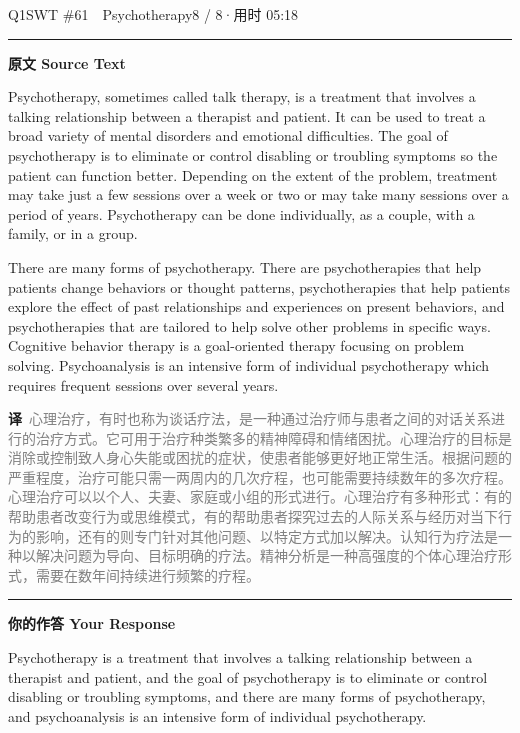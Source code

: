 \documentclass[11pt]{article}
\newcommand{\ptesub}[1]{%
  \par\needspace{2\baselineskip}\smallskip
  {\color{cAccent}\rule[-0.2ex]{3pt}{1.05em}}\hspace{6pt}%
  {\bfseries\color{cHead}#1}\par\nopagebreak\smallskip}
\newcommand{\zh}[1]{{\footnotesize\textcolor{cNote}{\textbf{译}}\ \textcolor{gray}{#1}}}
\begin{document}

\begin{qblock}{Q1\quad SWT \#61\ \ Psychotherapy}{8 / 8\quad·\quad 用时 05:18}

\ptesub{原文 Source Text}
\begin{promptbox}
Psychotherapy, sometimes called talk therapy, is a treatment that involves a talking relationship between a therapist and patient. It can be used to treat a broad variety of mental disorders and emotional difficulties. The goal of psychotherapy is to eliminate or control disabling or troubling symptoms so the patient can function better. Depending on the extent of the problem, treatment may take just a few sessions over a week or two or may take many sessions over a period of years. Psychotherapy can be done individually, as a couple, with a family, or in a group.

There are many forms of psychotherapy. There are psychotherapies that help patients change behaviors or thought patterns, psychotherapies that help patients explore the effect of past relationships and experiences on present behaviors, and psychotherapies that are tailored to help solve other problems in specific ways. Cognitive behavior therapy is a goal-oriented therapy focusing on problem solving. Psychoanalysis is an intensive form of individual psychotherapy which requires frequent sessions over several years.
\end{promptbox}
\zh{心理治疗，有时也称为谈话疗法，是一种通过治疗师与患者之间的对话关系进行的治疗方式。它可用于治疗种类繁多的精神障碍和情绪困扰。心理治疗的目标是消除或控制致人身心失能或困扰的症状，使患者能够更好地正常生活。根据问题的严重程度，治疗可能只需一两周内的几次疗程，也可能需要持续数年的多次疗程。心理治疗可以以个人、夫妻、家庭或小组的形式进行。心理治疗有多种形式：有的帮助患者改变行为或思维模式，有的帮助患者探究过去的人际关系与经历对当下行为的影响，还有的则专门针对其他问题、以特定方式加以解决。认知行为疗法是一种以解决问题为导向、目标明确的疗法。精神分析是一种高强度的个体心理治疗形式，需要在数年间持续进行频繁的疗程。}

\ptesub{你的作答 Your Response}
\begin{youbox}
Psychotherapy is a treatment that involves a talking relationship between a therapist and patient, and the goal of psychotherapy is to eliminate or control disabling or troubling symptoms, and there are many forms of psychotherapy, and psychoanalysis is an intensive form of individual psychotherapy.
\end{youbox}


\end{qblock}
\end{document}
